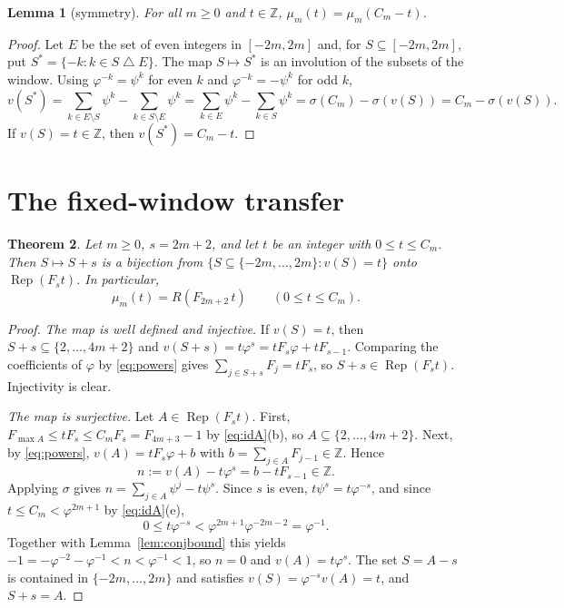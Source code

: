\documentclass[11pt]{amsart}
\newtheorem{theorem}{Theorem}[section]
\newtheorem{lemma}[theorem]{Lemma}
\theoremstyle{definition}
\theoremstyle{remark}
\numberwithin{equation}{section}
\newcommand{\Z}{\mathbb{Z}}
\newcommand{\val}{v}
\newcommand{\Rep}{\operatorname{Rep}}
\begin{document}
\begin{lemma}[symmetry]\label{lem:sym}
For all $m\ge0$ and $t\in\Z$, $\mu_m(t)=\mu_m(C_m-t)$.
\end{lemma}

\begin{proof}
Let $E$ be the set of even integers in $[-2m,2m]$ and, for $S\subseteq[-2m,2m]$, put
$S^*=\{-k:k\in S\mathbin{\triangle}E\}$. The map $S\mapsto S^*$ is an involution of the subsets of
the window. Using $\varphi^{-k}=\psi^k$ for even $k$ and $\varphi^{-k}=-\psi^k$ for odd $k$,
\[
  \val(S^*)=\sum_{k\in E\setminus S}\psi^k-\sum_{k\in S\setminus E}\psi^k
  =\sum_{k\in E}\psi^k-\sum_{k\in S}\psi^k=\sigma(C_m)-\sigma(\val(S))=C_m-\sigma(\val(S)).
\]
If $\val(S)=t\in\Z$, then $\val(S^*)=C_m-t$.
\end{proof}

\section{The fixed-window transfer}\label{sec:transfer}

\begin{theorem}\label{thm:transfer}
Let $m\ge0$, $s=2m+2$, and let $t$ be an integer with $0\le t\le C_m$. Then $S\mapsto S+s$ is a
bijection from $\{S\subseteq\{-2m,\dots,2m\}:\val(S)=t\}$ onto $\Rep(F_s t)$. In particular,
\[
  \mu_m(t)=R(F_{2m+2}\,t)\qquad(0\le t\le C_m).
\]
\end{theorem}

\begin{proof}
\emph{The map is well defined and injective.} If $\val(S)=t$, then $S+s\subseteq\{2,\dots,4m+2\}$
and $\val(S+s)=t\varphi^s=tF_s\varphi+tF_{s-1}$. Comparing the coefficients of $\varphi$ by
\eqref{eq:powers} gives $\sum_{j\in S+s}F_j=tF_s$, so $S+s\in\Rep(F_st)$. Injectivity is clear.

\emph{The map is surjective.} Let $A\in\Rep(F_st)$. First, $F_{\max A}\le tF_s\le C_mF_s=F_{4m+3}-1$ by
\eqref{eq:idA}(b), so $A\subseteq\{2,\dots,4m+2\}$. Next, by \eqref{eq:powers},
$\val(A)=tF_s\varphi+b$ with $b=\sum_{j\in A}F_{j-1}\in\Z$. Hence
\[
  n:=\val(A)-t\varphi^s=b-tF_{s-1}\in\Z.
\]
Applying $\sigma$ gives $n=\sum_{j\in A}\psi^j-t\psi^s$. Since $s$ is even, $t\psi^s=t\varphi^{-s}$,
and since $t\le C_m<\varphi^{2m+1}$ by \eqref{eq:idA}(e),
\[
  0\le t\varphi^{-s}<\varphi^{2m+1}\varphi^{-2m-2}=\varphi^{-1}.
\]
Together with Lemma~\ref{lem:conjbound} this yields
$-1=-\varphi^{-2}-\varphi^{-1}<n<\varphi^{-1}<1$, so $n=0$ and $\val(A)=t\varphi^s$. The set
$S=A-s$ is contained in $\{-2m,\dots,2m\}$ and satisfies $\val(S)=\varphi^{-s}\val(A)=t$, and
$S+s=A$.
\end{proof}
\end{document}
